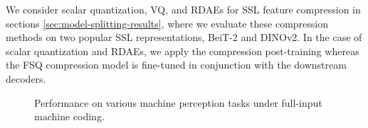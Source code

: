 \documentclass[10pt,twocolumn,letterpaper]{article}
\begin{document}
We consider scalar quantization, VQ, and RDAEs for SSL feature compression in sections \ref{sec:model-splitting-results}, where we evaluate these compression methods on two popular SSL representations, BeiT-2 and DINOv2. In the case of scalar quantization and RDAEs, we apply the compression post-training whereas the FSQ compression model is fine-tuned in conjunction with the downstream decoders. 



\begin{figure}
\begin{center}
\end{center}
\caption{\label{fig:mpq_results}%
Performance on various machine perception tasks under full-input machine coding.}
\end{figure}
\end{document}
